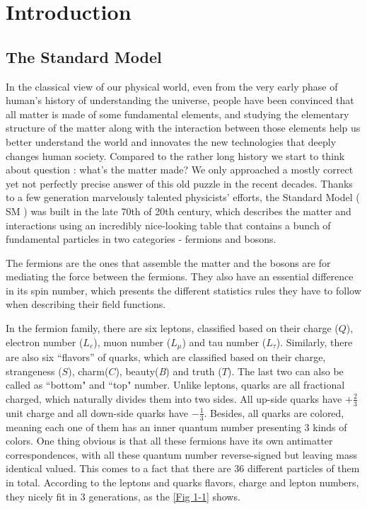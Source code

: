 \chapter{Introduction}

\section{The Standard Model}
In the classical view of our physical world, even from the very early phase of human's history of understanding the universe, people have been convinced that all matter is made of some fundamental elements, and studying the elementary structure of the matter along with the interaction between those elements help us better understand the world and innovates the new technologies that deeply changes human society. Compared to the rather long history we start to think about question : what's the matter made? We only approached a mostly correct yet not perfectly precise answer of this old puzzle in the recent decades. Thanks to a few generation marvelously talented physicists' efforts, the Standard Model ( SM ) was built in the late 70th of 20th century, which describes the matter and interactions using an incredibly nice-looking table that contains a bunch of fundamental particles in two categories - fermions and bosons. 

The fermions are the ones that assemble the matter and the bosons are for mediating the force between the fermions. They also have an essential difference in its spin number, which presents the different statistics rules they have to follow when describing their field functions. 

In the fermion family, there are six leptons, classified based on their charge ($\textit{Q}$), electron number ($\textit{L}_{e}$), muon number ($\textit{L}_{\mu}$) and tau number ($\textit{L}_{\tau}$). Similarly, there are also six ``flavors'' of quarks, which are classified based on their charge, strangeness ($\textit{S}$), charm($\textit{C}$), beauty(\textit{B}) and truth ($\textit{T}$). The last two can also be called as ``bottom" and ``top" number. Unlike leptons, quarks are all fractional charged, which naturally divides them into two sides. All up-side quarks have $+\frac{2}{3}$ unit charge and all down-side quarks have $-\frac{1}{3}$. Besides, all quarks are colored, meaning each one of them has an inner quantum number presenting 3 kinds of colors. One thing obvious is that all these fermions have its own antimatter correspondences, with all these quantum number reverse-signed but leaving mass identical valued. This comes to a fact that there are 36 different particles of them in total. According to the leptons and quarks flavors, charge and lepton numbers, they nicely fit in 3 generations, as the \ref{Fig 1-1} shows.

